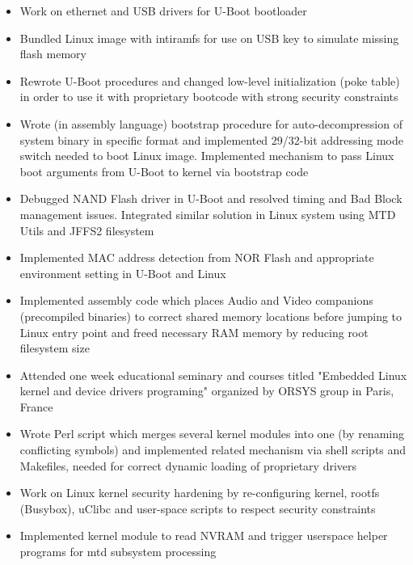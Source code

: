 \documentclass[a4paper, oneside, final]{scrartcl}
\begin{document}
\begin{itemize}
   \item Work on ethernet and USB drivers for U-Boot bootloader
   \item Bundled Linux image with intiramfs for use on 
            USB key to simulate missing flash memory
   \item Rewrote U-Boot procedures and changed low-level 
            initialization (poke table) in order to use it with 
            proprietary bootcode with strong security constraints
   \item Wrote (in assembly language) bootstrap procedure for 
            auto-decompression of system binary in specific format and 
            implemented 29/32-bit addressing mode switch needed to boot Linux
            image. Implemented mechanism to pass Linux boot arguments from U-Boot
            to kernel via bootstrap code
   \item Debugged NAND Flash driver in U-Boot and resolved timing and Bad Block management issues.
         Integrated similar solution in Linux system using MTD Utils and JFFS2 filesystem
   \item Implemented MAC address detection from NOR Flash 
            and appropriate environment setting in U-Boot and Linux
   \item Implemented assembly code which places Audio and Video companions
         (precompiled binaries) to correct shared memory locations before jumping
         to Linux entry point and freed necessary RAM memory by reducing root filesystem size
   \item Attended one week educational seminary and courses titled
         "Embedded Linux kernel and device drivers programing"
         organized by ORSYS group in Paris, France
   \item Wrote Perl script which merges several kernel modules into one
         (by renaming conflicting symbols) and implemented related mechanism
         via shell scripts and Makefiles, needed for correct dynamic
         loading of proprietary drivers
   \item Work on Linux kernel security hardening by re-configuring kernel,
         rootfs (Busybox), uClibc and user-space scripts to respect security constraints
   \item Implemented kernel module to read NVRAM and
         trigger userspace helper programs for mtd subsystem processing
\end{itemize}

\bigskip
\end{document}
